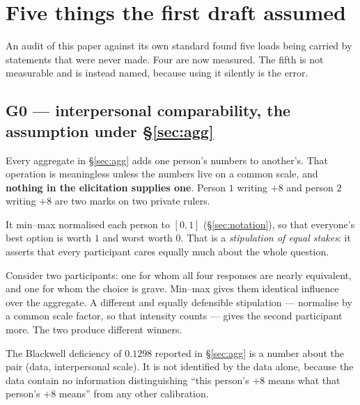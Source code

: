 \section{Five things the first draft assumed}
\label{sec:gaps}

An audit of this paper against its own standard found five loads being carried by
statements that were never made. Four are now measured. The fifth is not
measurable and is instead named, because using it silently is the error.

\subsection{G0 --- interpersonal comparability, the assumption under
\texorpdfstring{§\ref{sec:agg}}{the aggregation section}}

Every aggregate in §\ref{sec:agg} adds one person's numbers to another's. That
operation is meaningless unless the numbers live on a common scale, and
\textbf{nothing in the elicitation supplies one}. Person $1$ writing $+8$ and
person $2$ writing $+8$ are two marks on two private rulers.

 It min--max normalised each person to
$[0,1]$ (§\ref{sec:notation}), so that everyone's best option is worth $1$ and
worst worth $0$. That is a \emph{stipulation of equal stakes}: it asserts that
every participant cares equally much about the whole question.

 Consider two participants: one for
whom all four responses are nearly equivalent, and one for whom the choice is
grave. Min--max gives them identical influence over the aggregate. A different
and equally defensible stipulation --- normalise by a common scale factor, so
that intensity counts --- gives the second participant more. The two produce
different winners.

\begin{proposition}
The Blackwell deficiency of $0.1298$ reported in §\ref{sec:agg} is a number about
the pair (data, interpersonal scale). It is not identified by the data alone,
because the data contain no information distinguishing ``this person's $+8$ means
what that person's $+8$ means'' from any other calibration.
\end{proposition}

